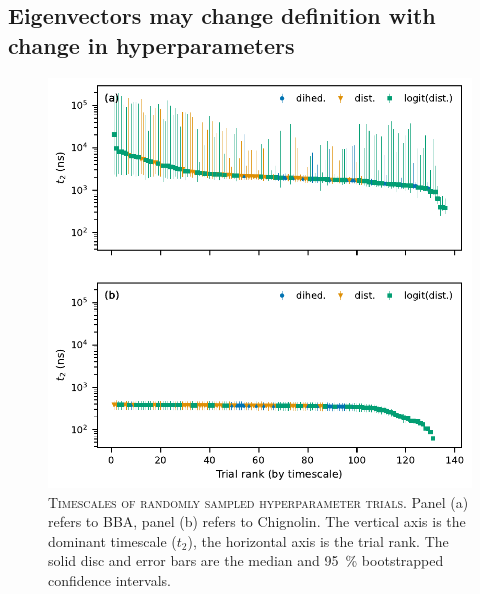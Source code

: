 \documentclass[journal=jacsat,manuscript=article]{achemso}
\begin{document}
\subsection{Eigenvectors may change definition with change in hyperparameters}

\begin{figure}[ht]
    \centering
    \includegraphics[width=0.7\columnwidth]{results1/timescale_distributions.pdf}
    \caption{\textsc{Timescales of randomly sampled hyperparameter trials.} Panel (a) refers to BBA, panel (b) refers to Chignolin. The vertical axis is the dominant timescale ($t_2$), the horizontal axis is the trial rank. The solid disc and error bars are the median and \SI{95}{\percent} bootstrapped confidence intervals.  }
    \label{fig:random_trials}
\end{figure}
\end{document}
